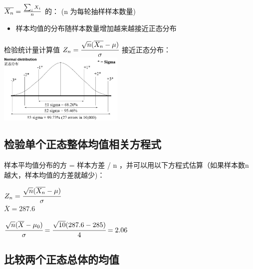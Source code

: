 \(\overline{X_n} = {\sum_i X_i \over n}\) 的： (n 为每轮抽样样本数量)

\begin{description}
\item[]
\end{description}

\begin{itemize}
\tightlist
\item
  样本均值的分布随样本数量增加越来越接近正态分布
\end{itemize}

检验统计量计算值
\(Z_n = \cfrac{ \sqrt{n}(\overline{X_n} - \mu) }{\sigma}\)
接近正态分布：\\

\includegraphics[width=6cm]{NormalDistributionBlankScreenshot_2023-04-16_201559.jpg}


\hypertarget{ux68c0ux9a8cux5355ux4e2aux6b63ux6001ux6574ux4f53ux5747ux503cux76f8ux5173ux65b9ux7a0bux5f0f}{%
\subsection{检验单个正态整体均值相关方程式}\label{ux68c0ux9a8cux5355ux4e2aux6b63ux6001ux6574ux4f53ux5747ux503cux76f8ux5173ux65b9ux7a0bux5f0f}}

样本平均值分布的方 = 样本方差 / n ，并可以用以下方程式估算（如果样本数n
越大，样本均值的方差就越少)：

\(Z_n = \cfrac{ \sqrt{n}(\overline{X_n} - \mu) }{\sigma}\)\\

\(\overline{X} = 287.6\)

\(\cfrac{ \sqrt{n}(\overline{X} - \mu_0) }{\sigma} = \cfrac{ \sqrt{10}( 287.6 - 285 ) }{4} = 2.06\)\\

\hypertarget{ux6bd4ux8f83ux4e24ux4e2aux6b63ux6001ux603bux4f53ux7684ux5747ux503c-1}{%
\subsection{比较两个正态总体的均值}\label{ux6bd4ux8f83ux4e24ux4e2aux6b63ux6001ux603bux4f53ux7684ux5747ux503c-1}}


